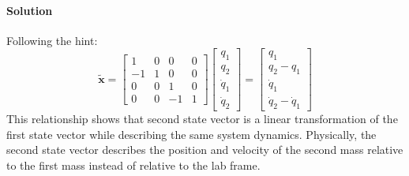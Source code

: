 \documentclass[11pt]{article}
\begin{document}
\paragraph{Solution} Following the hint:
\[\tilde{\mathbf{x}} = 
\begin{bmatrix}
1 & 0 & 0 & 0\\
-1 & 1 & 0 & 0\\
0 & 0 & 1 & 0\\
0 & 0 & -1 & 1
\end{bmatrix}
\begin{bmatrix}
q_1\\q_2\\\dot{q}_1\\\dot{q}_2
\end{bmatrix} =
\begin{bmatrix}
q_1\\
q_2-q_1\\
\dot{q}_1\\
\dot{q}_2-\dot{q}_1
\end{bmatrix}\]
This relationship shows that second state vector is a linear transformation of the first state vector while describing the same system dynamics. Physically, the second state vector describes the position and velocity of the second mass relative to the first mass instead of relative to the lab frame.
\end{document}
